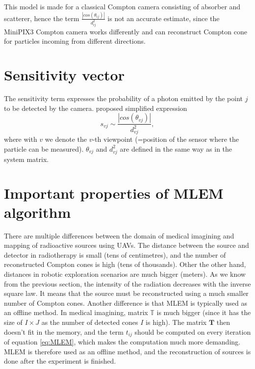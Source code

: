 This model is made for a classical Compton camera consisting of absorber and scatterer, hence the term $\frac{\left| cos(\theta_{ij}) \right|}{d^{2}_{ij}}$ is not an accurate estimate, since the MiniPIX3 Compton camera works differently and can reconstruct Compton cone for particles incoming from different directions.

\section{Sensitivity vector}
The sensitivity term expresses the probability of a photon emitted by the point $j$ to be detected by the camera. 
\cite{maxim2016} proposed simplified expression
\begin{equation}
  s_{vj} \sim \frac{\left| cos(\theta_{vj}) \right|}{d^{2}_{vj}},
\end{equation}
where with $v$ we denote the $v$-th viewpoint (=position of the sensor where the particle can be measured). $\theta_{vj}$ and $d^{2}_{vj}$ are defined in the same way as in the system matrix.

\section{Important properties of MLEM algorithm}
There are multiple differences between the domain of medical imagining and mapping of radioactive sources using \ac{UAV}s.
The distance between the source and detector in radiotherapy is small (tens of centimetres), and the number of reconstructed Compton cones is high (tens of thousands).
Other the other hand, distances in robotic exploration scenarios are much bigger (meters). 
As we know from the previous section, the intensity of the radiation decreases with the inverse square law.
It means that the source must be reconstructed using a much smaller number of Compton cones.
Another difference is that \ac{MLEM} is typically used as an offline method.
In medical imagining, matrix $\mathbb{T}$ is much bigger (since it has the size of $I \times J$ as the number of detected cones $I$ is high).
The matrix $\mathbf{T}$ then doesn't fit in the memory, and the term $t_{ij}$ should be computed on every iteration of equation \ref{eq:MLEM}, which makes the computation much more demanding.
\ac{MLEM} is therefore used as an offline method, and the reconstruction of sources is done after the experiment is finished.

